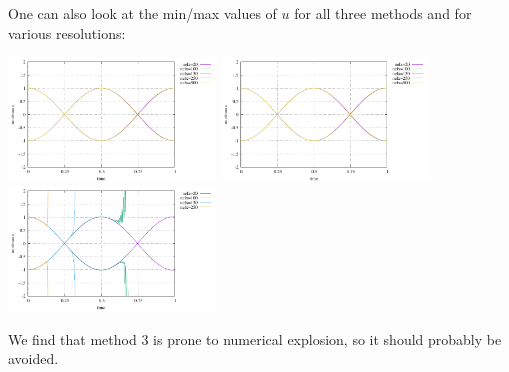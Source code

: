 One can also look at the min/max values of $u$ for all three methods and 
for various resolutions:
\begin{center}
\includegraphics[width=5.5cm]{python_codes/fieldstone_164/results/stats_meth1.pdf}
\includegraphics[width=5.5cm]{python_codes/fieldstone_164/results/stats_meth2.pdf}
\includegraphics[width=5.5cm]{python_codes/fieldstone_164/results/stats_meth3.pdf}
\end{center}
We find that method 3 is prone to numerical explosion, so
it should probably be avoided.




